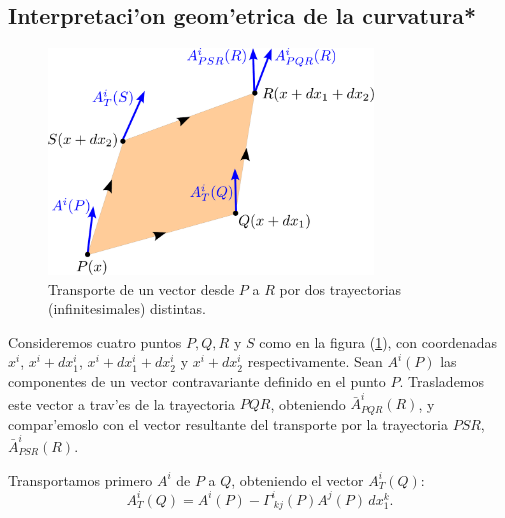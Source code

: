 \subsection{Interpretaci'on geom'etrica de la curvatura*}
\begin{center}
\begin{figure}[h!]
\centerline{\includegraphics[height=6cm]{fig/fig-transporte-y-curvatura-01.pdf}}
\caption{Transporte de un vector desde $P$ a $R$ por dos trayectorias (infinitesimales) distintas.}
\label{intgeomcurv}
\end{figure}
\end{center}

Consideremos cuatro puntos $P,Q,R$ y $S$ como en la figura (\ref{intgeomcurv}), con coordenadas $x^i $, $x^i+dx_1^i$, $x^i+dx_1^i+dx_2^i$ y $x^i+dx_2^i$ respectivamente.
Sean $A^i (P)$ las componentes de un vector contravariante definido en el punto $P$. Traslademos este vector a trav'es de la trayectoria $PQR$, obteniendo $\bar{A}^i_{PQR}(R)$, y compar'emoslo con el vector resultante del transporte por la trayectoria $PSR$, $\bar{A}^i_{PSR}(R)$.

Transportamos primero $A^i$ de $P$ a $Q$, obteniendo el vector $A_{T}^i(Q)$:
\begin{equation}
A_{T}^i(Q)=A^i(P) -\Gamma_{\ kj}^i(P)A^j(P)\, dx_1^k .
\label{AT1}%
\end{equation}

